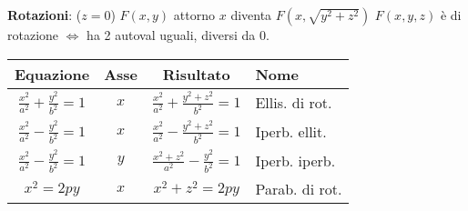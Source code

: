 \textbf{Rotazioni}: ($z = 0$) $F(x, y)$ attorno $x$ diventa $F(x, \sqrt{y^2+z^2})$
$F(x,y,z)$ è di rotazione $\Leftrightarrow$ ha 2 autoval uguali, diversi da 0.

\begin{tabular}{cccl}
	\textbf{Equazione} & \textbf{Asse} & \textbf{Risultato} & \textbf{Nome} \\
	\hline
	$\frac{x^2}{a^2}+\frac{y^2}{b^2}=1$ & $x$ & $\frac{x^2}{a^2}+\frac{y^2+z^2}{b^2}=1$ & Ellis. di rot. \\
	$\frac{x^2}{a^2}-\frac{y^2}{b^2}=1$ & $x$ & $\frac{x^2}{a^2}-\frac{y^2+z^2}{b^2}=1$ & Iperb. ellit. \\
	$\frac{x^2}{a^2}-\frac{y^2}{b^2}=1$ & $y$ & $\frac{x^2+z^2}{a^2}-\frac{y^2}{b^2}=1$ & Iperb. iperb. \\
	$x^2=2py$ & $x$ & $x^2+z^2=2py$ & Parab. di rot.
\end{tabular}
